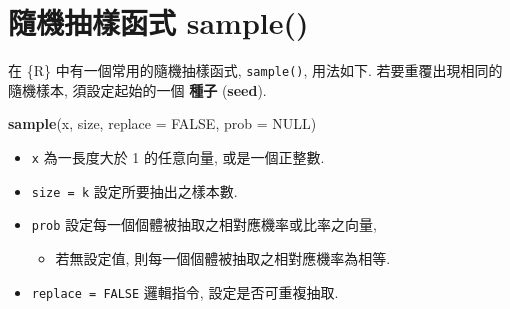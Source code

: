 \documentclass[
]{book}
\newenvironment{Shaded}{\begin{snugshade}}{\end{snugshade}}
\newcommand{\DataTypeTok}[1]{\textcolor[rgb]{0.13,0.29,0.53}{#1}}
\newcommand{\KeywordTok}[1]{\textcolor[rgb]{0.13,0.29,0.53}{\textbf{#1}}}
\newcommand{\NormalTok}[1]{#1}
\newcommand{\OtherTok}[1]{\textcolor[rgb]{0.56,0.35,0.01}{#1}}
\providecommand{\tightlist}{%
  \setlength{\itemsep}{0pt}\setlength{\parskip}{0pt}}
\begin{document}
\hypertarget{ux96a8ux6a5fux62bdux6a23ux51fdux5f0f-sample}{%
\section{隨機抽樣函式 sample()}\label{ux96a8ux6a5fux62bdux6a23ux51fdux5f0f-sample}}

在 \{R\} 中有一個常用的隨機抽樣函式, \texttt{sample()}, 用法如下.
若要重覆出現相同的隨機樣本, 須設定起始的一個
\textbf{種子}
(\textbf{seed}).

\begin{Shaded}
\begin{Highlighting}[]
\KeywordTok{sample}\NormalTok{(x, size, }\DataTypeTok{replace =} \OtherTok{FALSE}\NormalTok{, }\DataTypeTok{prob =} \OtherTok{NULL}\NormalTok{)}
\end{Highlighting}
\end{Shaded}

\begin{itemize}
\tightlist
\item
  \texttt{x} 為一長度大於 1 的任意向量, 或是一個正整數.
\item
  \texttt{size\ =\ k} 設定所要抽出之樣本數.
\item
  \texttt{prob} 設定每一個個體被抽取之相對應機率或比率之向量,

  \begin{itemize}
  \tightlist
  \item
    若無設定值, 則每一個個體被抽取之相對應機率為相等.
  \end{itemize}
\item
  \texttt{replace\ =\ FALSE} 邏輯指令, 設定是否可重複抽取.
\end{itemize}
\end{document}
